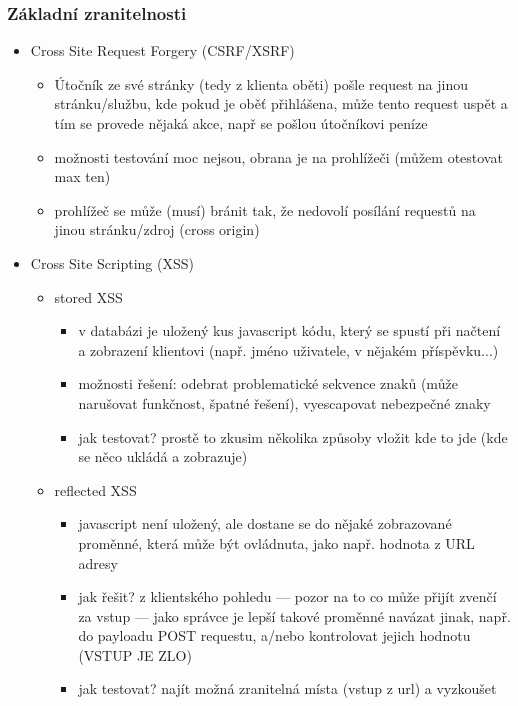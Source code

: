 \subsubsection*{Základní zranitelnosti}
\begin{itemize}
    \item Cross Site Request Forgery (CSRF/XSRF)
    \begin{itemize}
        \item Útočník ze své stránky (tedy z klienta oběti) pošle request na jinou stránku/službu, kde pokud je oběť přihlášena, může tento request uspět a tím se provede nějaká akce, např se pošlou útočníkovi peníze
        \item možnosti testování moc nejsou, obrana je na prohlížeči (můžem otestovat max ten)
        \item prohlížeč se může (musí) bránit tak, že nedovolí posílání requestů na jinou stránku/zdroj (cross origin)
    \end{itemize}
    \item Cross Site Scripting (XSS)
    \begin{itemize}
        \item stored XSS
        \begin{itemize}
            \item v databázi je uložený kus javascript kódu, který se spustí při načtení a zobrazení klientovi (např. jméno uživatele, v nějakém příspěvku...)
            \item možnosti řešení: odebrat problematické sekvence znaků (může narušovat funkčnost, špatné ře\-še\-ní), vyescapovat nebezpečné znaky
            \item jak testovat? prostě to zkusim několika způsoby vložit kde to jde (kde se něco ukládá a zobrazuje)
        \end{itemize}
        \item reflected XSS
        \begin{itemize}
            \item javascript není uložený, ale dostane se do nějaké zobrazované proměnné, která může být ov\-lád\-nu\-ta, jako např. hodnota z URL adresy
            \item jak řešit? z klientského pohledu --- pozor na to co může přijít zvenčí za vstup --- jako správce je lepší takové proměnné navázat jinak, např. do payloadu POST requestu, a/nebo kontrolovat jejich hodnotu (VSTUP JE ZLO)
            \item jak testovat? najít možná zranitelná místa (vstup z url) a vyzkoušet

\end{itemize}
\end{itemize}
\end{itemize}
